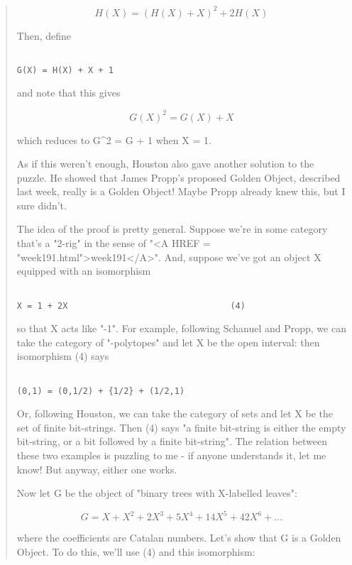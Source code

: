 \begin{quote}
$$

H(X) = (H(X) + X)^{2} + 2H(X)
$$
    
Then, define


\begin{verbatim}

G(X) = H(X) + X + 1 
\end{verbatim}
    
and note that this gives 


$$

G(X)^{2} = G(X) + X
$$
    
which reduces to G^{2} = G + 1 when X = 1.

As if this weren't enough, Houston also gave another solution to the
puzzle.  He showed that James Propp's proposed Golden Object, described 
last week, really is a Golden Object!  Maybe Propp already knew this, 
but I sure didn't.

The idea of the proof is pretty general.  Suppose we're in some category
that's a "2-rig" in the sense 
of "<A HREF = "week191.html">week191</A>".  And, suppose we've 
got an object X equipped with an isomorphism


\begin{verbatim}

X = 1 + 2X                                (4)
\end{verbatim}
    
so that X acts like "-1".  For example, following Schanuel and Propp, 
we can take the category of "\sigma -polytopes" and let X be the open 
interval: then isomorphism (4) says


\begin{verbatim}

(0,1) = (0,1/2) + {1/2} + (1/2,1)
\end{verbatim}
    
Or, following Houston, we can take the category of sets and let X be 
the set of finite bit-strings.  Then (4) says "a finite bit-string is 
either the empty bit-string, or a bit followed by a finite bit-string".  
The relation between these two examples is puzzling to me - if anyone
understands it, let me know!  But anyway, either one works.

Now let G be the object of "binary trees with X-labelled leaves":


$$

G = X + X^{2} + 2X^{3} + 5X^{4} + 14X^{5} + 42X^{6} + ...
$$
    
where the coefficients are Catalan numbers.  Let's show that G is a 
Golden Object.  To do this, we'll use (4) and this isomorphism:



\end{quote}
